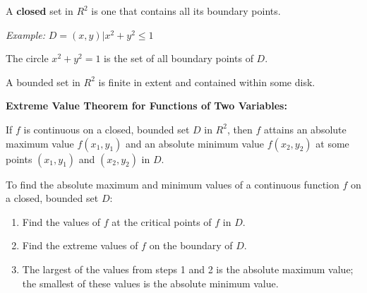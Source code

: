         \par A \textbf{closed} set in $R^{2}$ is one that contains all its boundary
            points.
        \par \textit{Example:} $D = {(x, y) | x^{2} + y^{2} \leq 1}$
        \par The circle $x^{2} + y^{2} = 1$ is the set of all boundary points
        of $D$.
        \par A bounded set in $R^{2}$ is finite in extent and contained within
        some disk.
        \par \textbf{Extreme Value Theorem for Functions of Two Variables:}
        \par If $f$ is continuous on a closed, bounded set $D$ in $R^{2}$, then $f$
        attains an absolute maximum value $f(x_{1}, y_{1})$ and an absolute
        minimum value $f(x_{2}, y_{2})$ at some points $(x_{1}, y_{1})$ and
        $(x_{2}, y_{2})$ in $D$.
        \par To find the absolute maximum and minimum values of a continuous
        function $f$ on a closed, bounded set $D$:
        \begin{enumerate}
            \item Find the values of $f$ at the critical points of $f$ in $D$.
            \item Find the extreme values of $f$ on the boundary of $D$.
            \item The largest of the values from steps 1 and 2 is the absolute
            maximum value; the smallest of these values is the absolute minimum
            value.
        \end{enumerate}

